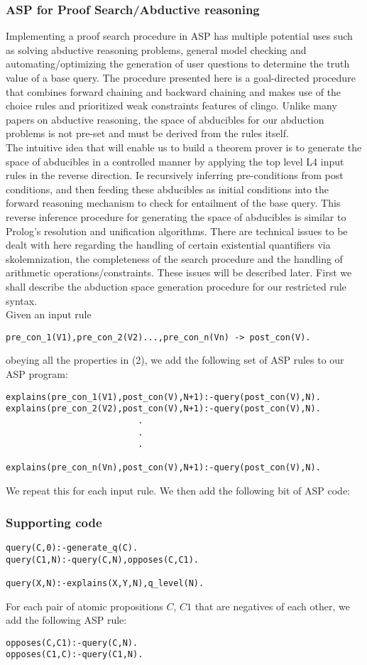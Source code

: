 \subsubsection{ASP for Proof Search/Abductive reasoning}
Implementing a proof search procedure in ASP has multiple potential uses such as solving abductive reasoning problems, general model checking and automating/optimizing the generation of user questions to determine the truth value of a base query. The procedure presented here is a goal-directed procedure that combines forward chaining and backward chaining and makes use of the choice rules and prioritized weak constraints features of clingo. Unlike many papers on abductive reasoning, the space of abducibles for our abduction problems is not pre-set  and must be derived from the rules itself.\\
The intuitive idea that will enable us to build a theorem prover is to generate the space of abducibles in a controlled manner by applying the top level L4 input rules  in the reverse direction. Ie recursively inferring pre-conditions from post conditions, and then feeding these abducibles as initial conditions into the forward reasoning mechanism to check for entailment of the base query. This reverse inference procedure for generating the space of abducibles is similar to Prolog's resolution and unification algorithms. There are technical issues to be dealt with here regarding the handling of certain existential quantifiers via skolemnization, the completeness of the search procedure and the handling of arithmetic operations/constraints. These issues will be described later. First we shall describe the abduction space generation procedure for our restricted rule syntax.\\
Given an input rule \begin{verbatim}
pre_con_1(V1),pre_con_2(V2)...,pre_con_n(Vn) -> post_con(V).
\end{verbatim} obeying all the properties in (2), we add the following set of ASP rules to our ASP program: \begin{verbatim}
explains(pre_con_1(V1),post_con(V),N+1):-query(post_con(V),N).
explains(pre_con_2(V2),post_con(V),N+1):-query(post_con(V),N).
                          .
                          .
                          .
                        
explains(pre_con_n(Vn),post_con(V),N+1):-query(post_con(V),N).
\end{verbatim}
We repeat this for each input rule. We then add the following bit of ASP code:
\subsubsection{Supporting code}
\begin{verbatim}
query(C,0):-generate_q(C).
query(C1,N):-query(C,N),opposes(C,C1).

query(X,N):-explains(X,Y,N),q_level(N).
\end{verbatim}
For each pair of atomic propositions $C$, $C1$ that are negatives of each other, we add the following ASP rule:
\begin{verbatim}
opposes(C,C1):-query(C,N).
opposes(C1,C):-query(C1,N).
\end{verbatim}
